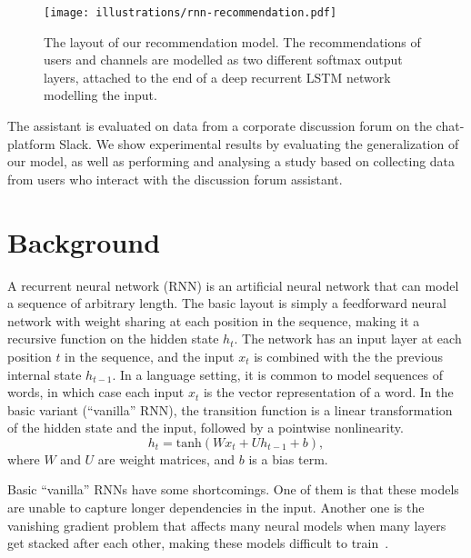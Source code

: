 \documentclass[11pt]{article}
\begin{document}
\begin{figure}[t]
  \texttt{[image: illustrations/rnn-recommendation.pdf]}
  \caption{The layout of our recommendation model. The recommendations of users and channels are modelled as two different softmax output layers, attached to the end of a deep recurrent LSTM network modelling the input.}
  \label{fig:rnn-recommendation}
\end{figure}

The assistant is evaluated on data from a corporate discussion forum on the chat-platform Slack. We show experimental results by evaluating the generalization of our model, as well as performing and analysing a study based on collecting data from users who interact with the discussion forum assistant.

\section{Background}

A recurrent neural network (RNN) is an artificial neural network that can model a sequence of arbitrary length. The basic layout is simply a feedforward neural network with weight sharing at each position in the sequence, making it a recursive function on the hidden state $h_t$. The network has an input layer at each position $t$ in the sequence, and the input $x_t$ is combined with the the previous internal state $h_{t-1}$. In a language setting, it is common to model sequences of words, in which case each input $x_t$ is the vector representation of a word. In the basic variant (``vanilla'' RNN), the transition function is a linear transformation of the hidden state and the input, followed by a pointwise nonlinearity.
\[ h_t = \mbox{tanh}( W x_t + U h_{t-1} + b),\]
where $W$ and $U$ are weight matrices, and $b$ is a bias term.

Basic ``vanilla'' RNNs have some shortcomings. One of them is that these models are unable to capture longer dependencies in the input. Another one is the vanishing gradient problem that affects many neural models when many layers get stacked after each other, making these models difficult to train~\cite{hochreiter1998vanishing,bengio1994learning}.
\end{document}
